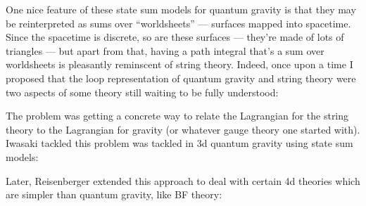 \documentclass{article}
\def\tightlist{}
\renewcommand{\texttt}[1]{%
  \begingroup
  \ttfamily
  \begingroup\lccode`~=`/\lowercase{\endgroup\def~}{/\discretionary{}{}{}}%
  \begingroup\lccode`~=`[\lowercase{\endgroup\def~}{[\discretionary{}{}{}}%
  \begingroup\lccode`~=`.\lowercase{\endgroup\def~}{.\discretionary{}{}{}}%
  \catcode`/=\active\catcode`[=\active\catcode`.=\active
  \scantokens{#1\noexpand}%
  \endgroup
}
\begin{document}
\begin{itemize}
  One nice feature of these state sum models for quantum gravity is that
  they may be reinterpreted as sums over ``worldsheets'' --- surfaces
  mapped into spacetime. Since the spacetime is discrete, so are these
  surfaces --- they're made of lots of triangles --- but apart from
  that, having a path integral that's a sum over worldsheets is
  pleasantly reminscent of string theory. Indeed, once upon a time I
  proposed that the loop representation of quantum gravity and string
  theory were two aspects of some theory still waiting to be fully
  understood:


  The problem was getting a concrete way to relate the Lagrangian for
  the string theory to the Lagrangian for gravity (or whatever gauge
  theory one started with). Iwasaki tackled this problem was tackled in
  3d quantum gravity using state sum models:


  Later, Reisenberger extended this approach to deal with certain 4d
  theories which are simpler than quantum gravity, like BF theory:



\end{itemize}
\end{document}
